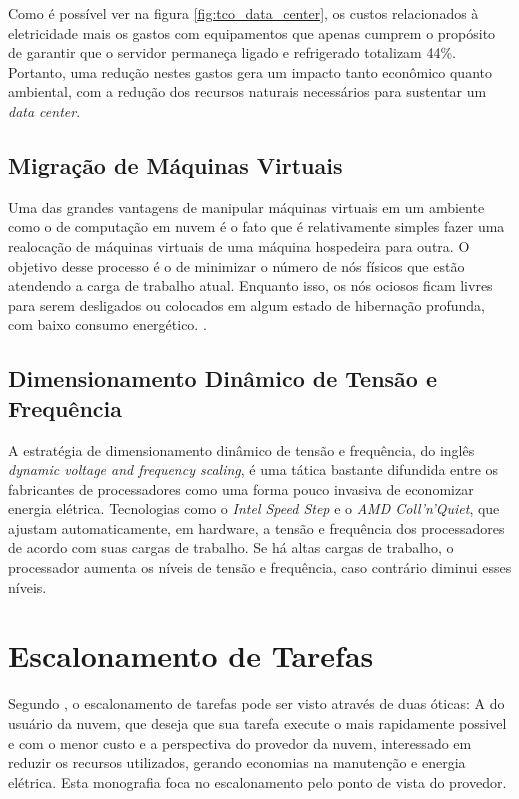 Como é possível ver na figura \ref{fig:tco_data_center}, os custos relacionados
à eletricidade mais os gastos com equipamentos que apenas cumprem o propósito de
garantir que o servidor permaneça ligado e refrigerado totalizam 44\%. Portanto,
uma redução nestes gastos gera um impacto tanto econômico quanto ambiental, com
a redução dos recursos naturais necessários para sustentar um \emph{data center}.

\subsection{Migração de Máquinas Virtuais}
Uma das grandes vantagens de manipular máquinas virtuais em um ambiente como
o de computação em nuvem é o fato que é relativamente simples fazer uma 
realocação de máquinas virtuais de uma máquina hospedeira para outra. O objetivo
desse processo é o de minimizar o número de nós físicos que estão atendendo a
carga de trabalho atual. Enquanto isso, os nós ociosos ficam livres para serem
desligados ou colocados em algum estado de hibernação profunda, com baixo consumo
energético. \cite{beloglazov:energy_efficient_allocation_virtual_machines}.

\subsection{Dimensionamento Dinâmico de Tensão e Frequência}
\label{subsec:dvfs}
A estratégia de dimensionamento dinâmico de tensão e frequência, do inglês 
\emph{dynamic voltage and frequency scaling}, é uma tática 
bastante difundida entre os fabricantes de processadores como uma forma pouco
invasiva de economizar energia elétrica. Tecnologias como o \emph{Intel Speed Step}
e o \emph{AMD Coll'n'Quiet}, que ajustam automaticamente, em hardware, a tensão
e frequência dos processadores de acordo com suas cargas de trabalho. Se há
altas cargas de trabalho, o processador aumenta os níveis de tensão e
frequência, caso contrário diminui esses níveis. 
\cite{lago:escalonamento_com_prioridade_eficiente}


\section{Escalonamento de Tarefas}
\label{sec:escalonamento_tarefas}
Segundo \cite{lago:escalonamento_com_prioridade_eficiente}, o escalonamento de 
tarefas pode ser visto através de duas óticas: A do usuário da nuvem, que deseja
que sua tarefa execute o mais rapidamente possivel e com o menor custo e a 
perspectiva do provedor da nuvem, interessado em reduzir os recursos utilizados,
gerando economias na manutenção e energia elétrica. Esta monografia foca no
escalonamento pelo ponto de vista do provedor. 


